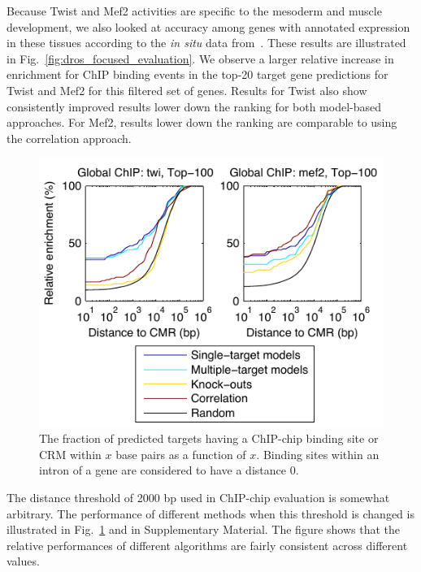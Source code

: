 \documentclass{pnastwo}
\begin{document}
\begin{article}
Because Twist and Mef2 activities are specific to the mesoderm and
muscle development, we also looked at accuracy among genes
with annotated expression in these tissues according to the
\emph{in situ} data from~\cite{Tomancak2002}. These results are illustrated in Fig.~\ref{fig:dros_focused_evaluation}. We observe a larger relative increase in enrichment for ChIP binding events in the top-20 target gene predictions for Twist and Mef2 for this filtered set of genes. Results for Twist also show consistently improved results lower down the ranking for both model-based approaches. For Mef2, results lower down the ranking are comparable to using the correlation approach.


\begin{figure}[tb]
  \centering
  \includegraphics{dros_binding_site_distances}
  \caption{The fraction of predicted targets having a ChIP-chip
    binding site or CRM within $x$ base pairs as a function of $x$.
    Binding sites within an intron of a gene are considered to
    have a distance 0.
    \label{fig:dros_binding_site_distances}}
\end{figure}

The distance threshold of 2000 bp used in ChIP-chip evaluation is
somewhat arbitrary.  The performance of different methods when this
threshold is changed is illustrated in
Fig.~\ref{fig:dros_binding_site_distances} and in Supplementary
Material.  The figure shows that the relative performances of
different algorithms are fairly consistent across different values.


\end{article}
\end{document}
